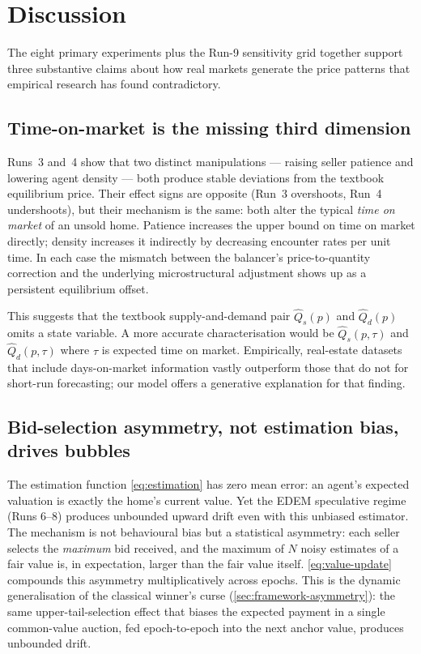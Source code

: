 \section{Discussion}
\label{sec:discussion}

The eight primary experiments plus the Run-9 sensitivity grid
together support three substantive claims about
how real markets generate the price patterns that empirical research
has found contradictory.

\subsection{Time-on-market is the missing third dimension}
\label{sec:disc-tom}

Runs~3 and~4 show that two distinct manipulations --- raising seller
patience and lowering agent density --- both produce stable
deviations from the textbook equilibrium price. Their effect signs
are opposite (Run~3 overshoots, Run~4 undershoots), but their
mechanism is the same: both alter the typical \emph{time on market}
of an unsold home. Patience increases the upper bound on time on
market directly; density increases it indirectly by decreasing
encounter rates per unit time. In each case the mismatch between the
balancer's price-to-quantity correction and the underlying microstructural
adjustment shows up as a persistent equilibrium offset.

This suggests that the textbook supply-and-demand pair $\hat{Q}_{s}(p)$
and $\hat{Q}_{d}(p)$ omits a state variable. A more accurate
characterisation would be $\hat{Q}_{s}(p, \tau)$ and
$\hat{Q}_{d}(p, \tau)$ where $\tau$ is expected time on market.
Empirically, real-estate datasets that include days-on-market
information vastly outperform those that do not for short-run
forecasting; our model offers a generative explanation for that
finding.

\subsection{Bid-selection asymmetry, not estimation bias, drives bubbles}
\label{sec:disc-bias}

The estimation function \cref{eq:estimation} has zero mean error: an
agent's expected valuation is exactly the home's current value. Yet
the EDEM speculative regime (Runs 6--8) produces unbounded upward
drift even with this unbiased estimator. The mechanism is not
behavioural bias but a statistical asymmetry: each seller selects the
\emph{maximum} bid received, and the maximum of $N$ noisy estimates
of a fair value is, in expectation, larger than the fair value
itself. \cref{eq:value-update} compounds this asymmetry
multiplicatively across epochs. This is the dynamic generalisation of
the classical winner's curse \citep{thaler1988winners}
(\cref{sec:framework-asymmetry}): the same upper-tail-selection effect
that biases the expected payment in a single common-value auction,
fed epoch-to-epoch into the next anchor value, produces unbounded
drift.


